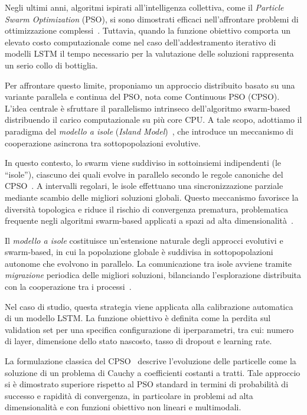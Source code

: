 \documentclass{article}
\begin{document}
Negli ultimi anni, algoritmi ispirati all’intelligenza collettiva, come il \textit{Particle Swarm Optimization} 
(PSO), si sono dimostrati efficaci nell'affrontare problemi di ottimizzazione complessi~\cite{kennedy1995particle, 
eberhart2001pso}. Tuttavia, quando la funzione obiettivo comporta un elevato costo computazionale 
come nel caso dell’addestramento iterativo di modelli LSTM il tempo necessario per la valutazione 
delle soluzioni rappresenta un serio collo di bottiglia.

Per affrontare questo limite, proponiamo un approccio distribuito basato su una variante parallela e 
continua del PSO, nota come Continuous PSO (CPSO). L’idea centrale è sfruttare il parallelismo 
intrinseco dell’algoritmo swarm-based distribuendo il carico computazionale su più core CPU. A tale 
scopo, adottiamo il paradigma del \textit{modello a isole} (\textit{Island Model})~\cite{cantupaz1998survey, 
tomassini2005spatially}, che introduce un meccanismo di cooperazione asincrona tra sottopopolazioni 
evolutive.

In questo contesto, lo swarm viene suddiviso in sottoinsiemi indipendenti (le “isole”), ciascuno dei 
quali evolve in parallelo secondo le regole canoniche del CPSO~\cite{Ricciardello2020}. A intervalli 
regolari, le isole effettuano una sincronizzazione parziale mediante scambio delle migliori soluzioni 
globali. Questo meccanismo favorisce la diversità topologica e riduce il rischio di convergenza prematura, 
problematica frequente negli algoritmi swarm-based applicati a spazi ad alta dimensionalità~\cite{omran2005dynamic}.

Il \textit{modello a isole} costituisce un’estensione naturale degli approcci evolutivi e swarm-based, in cui 
la popolazione globale è suddivisa in sottopopolazioni autonome che evolvono in parallelo. La comunicazione 
tra isole avviene tramite \textit{migrazione} periodica delle migliori soluzioni, bilanciando l'esplorazione 
distribuita con la cooperazione tra i processi~\cite{tomassini2005spatially, cantupaz1998survey}.

Nel caso di studio, questa strategia viene applicata alla calibrazione automatica di un modello LSTM. 
La funzione obiettivo è definita come la perdita sul validation set per una specifica configurazione 
di iperparametri, tra cui: numero di layer, dimensione dello stato nascosto, tasso di dropout e learning 
rate.

La formulazione classica del CPSO~\cite{Ricciardello2020} descrive l’evoluzione delle particelle come la 
soluzione di un problema di Cauchy a coefficienti costanti a tratti. Tale approccio si è dimostrato 
superiore rispetto al PSO standard in termini di probabilità di successo e rapidità di convergenza, in 
particolare in problemi ad alta dimensionalità e con funzioni obiettivo non lineari e multimodali.
\end{document}
